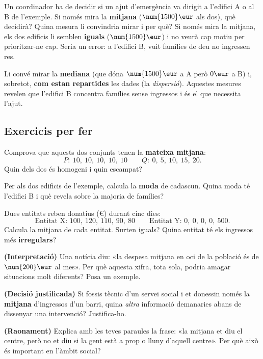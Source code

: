 \begin{exresolt}
Un coordinador ha de decidir si un ajut d'emergència va dirigit a l'edifici A o al B
de l'exemple. Si només mira la \textbf{mitjana} ($\num{1500}\eur$ als dos), què
decidirà? Quina mesura li convindria mirar i per què?
\solucio
Si només mira la mitjana, els dos edificis li semblen \textbf{iguals}
($\num{1500}\eur$) i no veurà cap motiu per prioritzar-ne cap. Seria un error: a
l'edifici B, vuit famílies de deu no ingressen res.

Li convé mirar la \textbf{mediana} (que dóna $\num{1500}\eur$ a A però $0\eur$ a B) i,
sobretot, \textbf{com estan repartides} les dades (la \emph{dispersió}). Aquestes
mesures revelen que l'edifici B concentra famílies sense ingressos i és el que
necessita l'ajut.
\end{exresolt}

\subsection{Exercicis per fer}

\begin{exercicis}
\begin{exlist}
  \item Comprova que aquests dos conjunts tenen la \textbf{mateixa mitjana}:
        \[
        P:\ 10,\ 10,\ 10,\ 10,\ 10 \qquad Q:\ 0,\ 5,\ 10,\ 15,\ 20.
        \]
        Quin dels dos és homogeni i quin escampat?
  \item Per als dos edificis de l'exemple, calcula la \textbf{moda} de cadascun.
        Quina moda té l'edifici B i què revela sobre la majoria de famílies?
  \item Dues entitats reben donatius (€) durant cinc dies:
        \[
        \text{Entitat X: } 100,\ 120,\ 110,\ 90,\ 80 \qquad
        \text{Entitat Y: } 0,\ 0,\ 0,\ 0,\ 500.
        \]
        Calcula la mitjana de cada entitat. Surten iguals? Quina entitat té els
        ingressos més \textbf{irregulars}?
  \item \textbf{(Interpretació)} Una notícia diu: «la despesa mitjana en oci de la
        població és de $\num{200}\eur$ al mes». Per què aquesta xifra, tota sola,
        podria amagar situacions molt diferents? Posa un exemple.
  \item \textbf{(Decisió justificada)} Si fossis tècnic d'un servei social i et
        donessin només la \textbf{mitjana} d'ingressos d'un barri, quina \emph{altra}
        informació demanaries abans de dissenyar una intervenció? Justifica-ho.
  \item \textbf{(Raonament)} Explica amb les teves paraules la frase: «la mitjana et
        diu el centre, però no et diu si la gent està a prop o lluny d'aquell centre».
        Per què això és important en l'àmbit social?
\end{exlist}
\end{exercicis}

